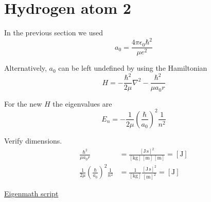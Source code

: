 

\section*{Hydrogen atom 2}

In the previous section we used
\begin{equation*}
a_0=\frac{4\pi\epsilon_0\hbar^2}{\mu e^2}
\end{equation*}

Alternatively, $a_0$ can be left undefined by using the Hamiltonian
\begin{equation*}
H=-\frac{\hbar^2}{2\mu}\nabla^2-\frac{\hbar^2}{\mu a_0r}
\end{equation*}

For the new $H$ the eigenvalues are
\begin{equation*}
E_n=-\frac{1}{2\mu}\left(\frac{\hbar}{a_0}\right)^2\frac{1}{n^2}
\end{equation*}

Verify dimensions.
\begin{align*}
\frac{\hbar^2}{\mu a_0r}
&=\frac{[\text{J}\,\text{s}]^2}{[\text{kg}]\,[\text{m}]\,[\text{m}]}=[\text{J}]
\\[1ex]
\frac{1}{2\mu}\left(\frac{\hbar}{a_0}\right)^2\frac{1}{n^2}
&=\frac{1}{[\text{kg}]}\frac{[\text{J}\,\text{s}]^2}{[\text{m}]^2}=[\text{J}]
\end{align*}

\href{https://georgeweigt.github.io/examples/hydrogen-atom-2-demo.html}{Eigenmath script}



